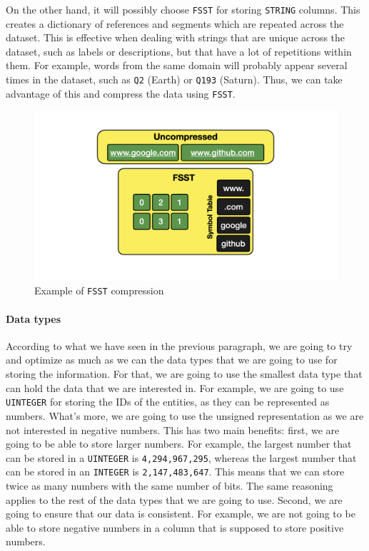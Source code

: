On the other hand, it will possibly choose \texttt{FSST} for storing \texttt{STRING} columns. This creates a dictionary of references and segments which are repeated across the dataset. This is effective when dealing with strings that are unique across the dataset, such as labels or descriptions, but that have a lot of repetitions within them. For example, words from the same domain will probably appear several times in the dataset, such as \texttt{Q2} (Earth) or \texttt{Q193} (Saturn). Thus, we can take advantage of this and compress the data using \texttt{FSST}.

\begin{figure}[ht]
    \centering
    \includegraphics[width=.8\linewidth]{figures/diagrams/10-3_fsst.png}
    \caption[Example of \texttt{FSST} compression]{Example of \texttt{FSST} compression \cite{Raasveldt_2022}}
\end{figure}

\paragraph{Data types}

According to what we have seen in the previous paragraph, we are going to try and optimize as much as we can the data types that we are going to use for storing the information. For that, we are going to use the smallest data type that can hold the data that we are interested in. For example, we are going to use \texttt{UINTEGER} for storing the IDs of the entities, as they can be represented as numbers. What's more, we are going to use the unsigned representation as we are not interested in negative numbers. This has two main benefits: first, we are going to be able to store larger numbers. For example, the largest number that can be stored in a \texttt{UINTEGER} is \texttt{4,294,967,295}, whereas the largest number that can be stored in an \texttt{INTEGER} is \texttt{2,147,483,647}. This means that we can store twice as many numbers with the same number of bits. The same reasoning applies to the rest of the data types that we are going to use. Second, we are going to ensure that our data is consistent. For example, we are not going to be able to store negative numbers in a column that is supposed to store positive numbers.

